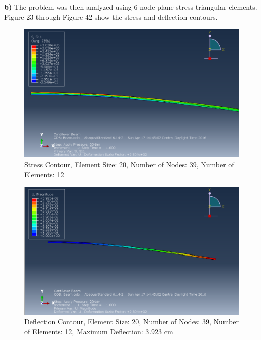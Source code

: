 \documentclass[a4paper]{article}
\begin{document}
\textbf{b)}
The problem was then analyzed using 6-node plane stress triangular elements. Figure 23 through Figure 42 show the stress and deflection contours.

\begin{figure}[ht]
\centering
\includegraphics[scale=.5]{6Nsize20Stress.PNG}
\caption{Stress Contour, Element Size: 20, Number of Nodes: 39, Number of Elements: 12}
\end{figure}
\begin{figure}[ht]
\centering
\includegraphics[scale=.5]{6Nsize20MDisplacement.PNG}
\caption{Deflection Contour, Element Size: 20, Number of Nodes: 39, Number of Elements: 12, Maximum Deflection: 3.923 cm}
\end{figure}
\end{document}
